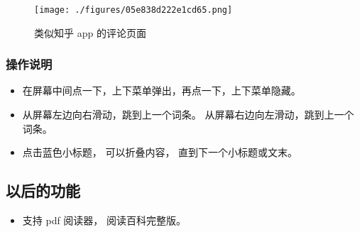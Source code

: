 \begin{figure}[ht]
\centering
\texttt{[image: ./figures/05e838d222e1cd65.png]}
\caption{类似知乎 app 的评论页面} \label{fig_app_2}
\end{figure}

\subsubsection{操作说明}
\begin{itemize}
\item 在屏幕中间点一下，上下菜单弹出，再点一下，上下菜单隐藏。
\item 从屏幕左边向右滑动，跳到上一个词条。 从屏幕右边向左滑动，跳到上一个词条。
\item 点击蓝色小标题， 可以折叠内容， 直到下一个小标题或文末。
\end{itemize}

\subsection{以后的功能}
\begin{itemize}
\item 支持 pdf 阅读器， 阅读百科完整版。
\end{itemize}
